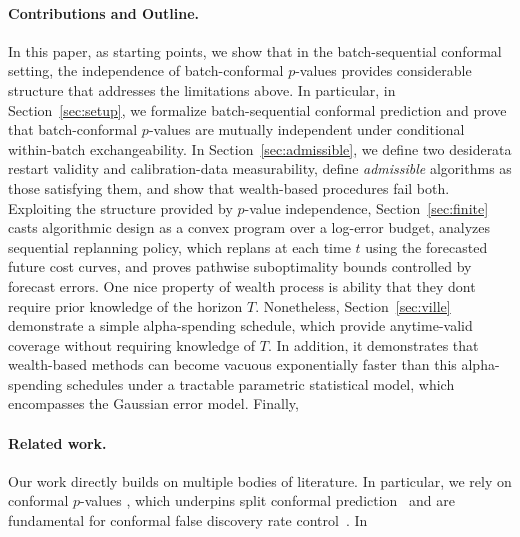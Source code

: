 \documentclass{uai2026} %
\newcommand{\1}{\mathbf{1}}
\begin{document}
\paragraph{Contributions and Outline.} In this paper, as starting points, we show that in the batch-sequential conformal setting, the independence of batch-conformal $p$-values provides considerable structure that addresses the limitations above. In particular, in Section~\ref{sec:setup}, we formalize batch-sequential conformal prediction and prove that batch-conformal $p$-values are mutually independent under conditional within-batch exchangeability. In Section~\ref{sec:admissible}, we define two desiderata restart validity and calibration-data measurability, define \emph{admissible} algorithms as those satisfying them, and show that wealth-based procedures fail both. Exploiting the structure provided by $p$-value independence, Section~\ref{sec:finite} casts algorithmic design as a convex program over a log-error budget, analyzes sequential replanning policy, which replans at each time $t$ using the forecasted future cost curves, and proves pathwise suboptimality bounds controlled by forecast errors. One nice property of wealth process is ability that they dont require prior knowledge of the horizon $T$. Nonetheless, Section~\ref{sec:ville}  demonstrate a simple alpha-spending schedule, which provide anytime-valid coverage without requiring knowledge of $T$. In addition, it demonstrates that wealth-based methods can become vacuous exponentially faster than this alpha-spending schedules under a tractable parametric statistical model, which encompasses the Gaussian error model. Finally,

\paragraph*{Related work.}
Our work directly builds on multiple bodies of literature. In particular, we rely on conformal $p$-values \citep{papadopoulos2002inductive}, which underpins split conformal prediction~\citep{papadopoulos2008inductive,lei2018distribution,romano2019conformalized} and are fundamental for conformal false discovery rate control~\citep{bates2023testing,jin2023selection}. In
\end{document}
